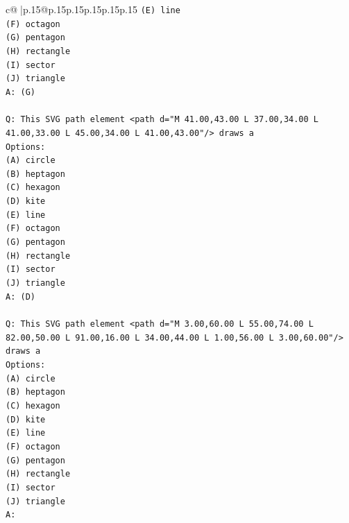 \documentclass{article}
\begin{document}
{\begin{supertabular}{c@{$\;$}|p{.15\linewidth}@{}p{.15\linewidth}p{.15\linewidth}p{.15\linewidth}p{.15\linewidth}p{.15\linewidth}}
{{{\texttt{(E) line} \\
\texttt{(F) octagon} \\
\texttt{(G) pentagon} \\
\texttt{(H) rectangle} \\
\texttt{(I) sector} \\
\texttt{(J) triangle} \\
\texttt{A: (G)} \\
\\ 
\texttt{Q: This SVG path element <path d="M 41.00,43.00 L 37.00,34.00 L 41.00,33.00 L 45.00,34.00 L 41.00,43.00"/> draws a} \\
\texttt{Options:} \\
\texttt{(A) circle} \\
\texttt{(B) heptagon} \\
\texttt{(C) hexagon} \\
\texttt{(D) kite} \\
\texttt{(E) line} \\
\texttt{(F) octagon} \\
\texttt{(G) pentagon} \\
\texttt{(H) rectangle} \\
\texttt{(I) sector} \\
\texttt{(J) triangle} \\
\texttt{A: (D)} \\
\\ 
\texttt{Q: This SVG path element <path d="M 3.00,60.00 L 55.00,74.00 L 82.00,50.00 L 91.00,16.00 L 34.00,44.00 L 1.00,56.00 L 3.00,60.00"/> draws a} \\
\texttt{Options:} \\
\texttt{(A) circle} \\
\texttt{(B) heptagon} \\
\texttt{(C) hexagon} \\
\texttt{(D) kite} \\
\texttt{(E) line} \\
\texttt{(F) octagon} \\
\texttt{(G) pentagon} \\
\texttt{(H) rectangle} \\
\texttt{(I) sector} \\
\texttt{(J) triangle} \\
\texttt{A:} \\
            }
        }
    }
     \\ \\


\end{supertabular}}
\end{document}
